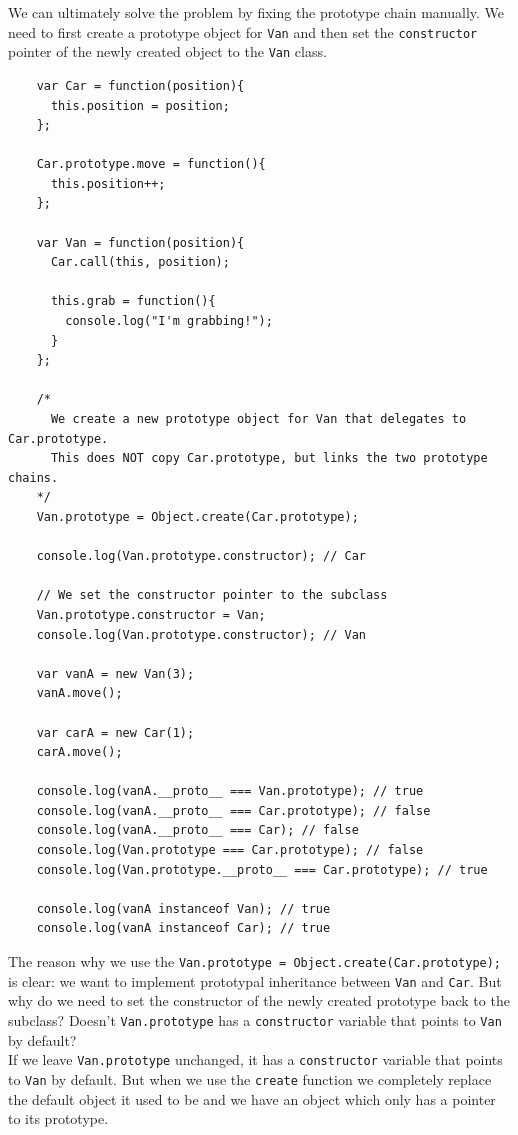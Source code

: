 \documentclass{scrbook}
\begin{document}
We can ultimately solve the problem by fixing the prototype chain manually. We need to first create a prototype object for \texttt{Van} and then set the \texttt{constructor} pointer of the newly created object to the \texttt{Van} class.

\begin{lstlisting}
    var Car = function(position){
      this.position = position;
    };
    
    Car.prototype.move = function(){
      this.position++;
    };
    
    var Van = function(position){
      Car.call(this, position);
      
      this.grab = function(){
        console.log("I'm grabbing!");
      }
    };
    
    /*
      We create a new prototype object for Van that delegates to Car.prototype.
      This does NOT copy Car.prototype, but links the two prototype chains.
    */
    Van.prototype = Object.create(Car.prototype);
    
    console.log(Van.prototype.constructor); // Car
    
    // We set the constructor pointer to the subclass
    Van.prototype.constructor = Van;
    console.log(Van.prototype.constructor); // Van
    
    var vanA = new Van(3);
    vanA.move();
    
    var carA = new Car(1);
    carA.move();
    
    console.log(vanA.__proto__ === Van.prototype); // true
    console.log(vanA.__proto__ === Car.prototype); // false
    console.log(vanA.__proto__ === Car); // false
    console.log(Van.prototype === Car.prototype); // false
    console.log(Van.prototype.__proto__ === Car.prototype); // true
    
    console.log(vanA instanceof Van); // true
    console.log(vanA instanceof Car); // true
\end{lstlisting}

The reason why we use the \texttt{Van.prototype = Object.create(Car.prototype);} is clear: we want to implement prototypal inheritance between \texttt{Van} and \texttt{Car}. But why do we need to set the constructor of the newly created prototype back to the subclass? Doesn't \texttt{Van.prototype} has a \texttt{constructor} variable that points to \texttt{Van} by default?\\

If we leave \texttt{Van.prototype} unchanged, it has a \texttt{constructor} variable that points to \texttt{Van} by default. But when we use the \texttt{create} function we completely replace the default object it used to be and we have an object which only has a pointer to its prototype.
\end{document}

